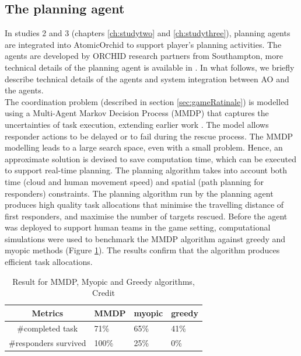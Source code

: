 \subsection{The planning agent}\label{sec:appagent}
In studies 2 and 3 (chapters \ref{ch:studytwo} and \ref{ch:studythree}), planning agents are integrated into AtomicOrchid to support player's planning activities. The agents are developed by ORCHID research partners from Southampton, more technical details of the planning agent is available in \cite{Ramchurn2015a}. In what follows, we briefly describe technical details of the agents and system integration between \ac{AO} and the agents.  \\

The coordination problem (described in section \ref{sec:gameRatinale}) is modelled using a Multi-Agent Markov Decision Process (MMDP) that captures the uncertainties of task execution, extending earlier work \citep{Wu2015}. The model allows responder actions to be delayed or to fail during the rescue process. The MMDP modelling leads to a large search space, even with a small problem. Hence,  an approximate solution is devised to save computation time, which can be executed to support real-time planning. The planning algorithm takes into account both time (cloud and human movement speed) and spatial (path planning for responders) constraints. The planning algorithm run by the planning agent produces high quality task allocations that minimise the travelling distance of first responders, and maximise the number of targets rescued. Before the agent was deployed to support human teams in the game setting, computational simulations were used to benchmark the MMDP algorithm against greedy and myopic methods (Figure \ref{tab:agentBenchmarking}). The results confirm that the algorithm produces efficient task allocations.\\


\begin{table}[h]
\centering
\begin{tabular}{c|lll}
Metrics               & MMDP  & myopic & greedy \\ \hline
\#completed task      & 71\%  & 65\%   & 41\%   \\
\#responders survived & 100\% & 25\%   & 0\%   
\end{tabular}
\caption{Result for MMDP, Myopic and Greedy algorithms, Credit \cite{Ramchurn2015a}}
\label{tab:agentBenchmarking}
\end{table}

